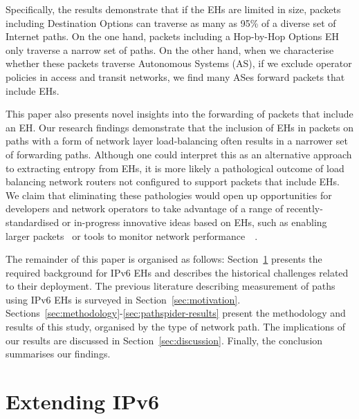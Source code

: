 \documentclass[conference]{IEEEtran}
\begin{document}

Specifically, the results demonstrate that if the EHs are limited in size,
packets including Destination Options can traverse as many as
95\% of a diverse set of Internet paths.  On the one hand, packets including a Hop-by-Hop Options EH only traverse a narrow set of paths. On the other hand, when we
characterise whether these packets traverse Autonomous Systems (AS), if we exclude operator policies in access and transit networks, we find many ASes forward packets that include EHs.

This paper also presents novel insights into the forwarding of packets that include an EH. Our research findings
demonstrate that the inclusion of EHs in packets on paths with a form of network layer load-balancing often results in a narrower set of forwarding paths. Although one could interpret this as an alternative approach to extracting entropy from EHs, it is more likely a
pathological outcome of load balancing network routers not configured to support packets that include EHs.
We claim that eliminating these pathologies would open up opportunities for
developers and network operators to take advantage of a range of recently-standardised or in-progress innovative ideas based on EHs, such as enabling larger packets~\cite{rfc9268} or tools to monitor network performance~\cite{rfc8250}~\cite{ietf-ippm-ioam-ipv6-options-10}.


The remainder of this paper is organised as follows:  Section~\ref{sec:background} presents
the required background for IPv6 EHs and describes the historical challenges related to
their deployment.  The previous literature describing measurement of paths using IPv6
EHs is surveyed in Section~\ref{sec:motivation}.
Sections~\ref{sec:methodology}-\ref{sec:pathspider-results} present the
methodology and results of this study, organised by the type of network path.  The
implications of our results are discussed in Section~\ref{sec:discussion}.
Finally, the conclusion summarises our findings.

\section{Extending IPv6}
\label{sec:background}

\label{sec:ipv6-option-deployment}
\end{document}

